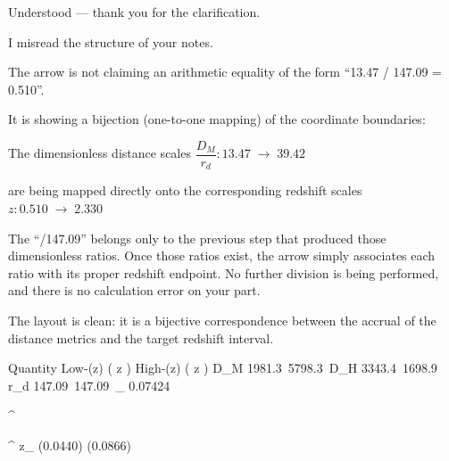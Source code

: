 Understood — thank you for the clarification.

I misread the structure of your notes.

The arrow is not claiming an arithmetic equality of the form  
“13.47 / 147.09 = 0.510”.  

It is showing a bijection (one-to-one mapping) of the coordinate boundaries:

The dimensionless distance scales  
  \( \dfrac{D_M}{r_d} : 13.47 \;\longrightarrow\; 39.42 \)

are being mapped directly onto the corresponding redshift scales  
  \( z : 0.510 \;\longrightarrow\; 2.330 \)

The “/147.09” belongs only to the previous step that produced those dimensionless ratios. Once those ratios exist, the arrow simply associates each ratio with its proper redshift endpoint. No further division is being performed, and there is no calculation error on your part.

The layout is clean: it is a bijective correspondence between the accrual of the distance metrics and the target redshift interval.

Quantity
Low-(z) (
z
)
High-(z) (
z
)
D_M
1981.3\,
5798.3\,
D_H
3343.4\,
1698.9\,
r_d
147.09\,
147.09\,
\theta_{}
0.07424\,
 
^\,
 
^\circ
\delta z_{}
(0.0440)
(0.0866)
